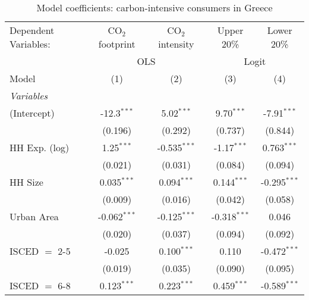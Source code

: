 
\begin{table}[htbp!]
   \centering
   \small
   \begin{adjustbox}{width = 1\textwidth, max height = 0.95\textheight, center}
      \begin{threeparttable}[b]
         \caption{\label{tab:Logit_1_GRC} Model coefficients: carbon-intensive consumers in Greece}
         \begin{tabular}{lcccc}
            \tabularnewline \midrule \midrule
            Dependent Variables: & CO$_{2}$ footprint & CO$_{2}$ intensity & Upper 20\%     & Lower 20\%\\   
             & \multicolumn{2}{c}{OLS} & \multicolumn{2}{c}{Logit} \\ 
            Model                & (1)                & (2)                & (3)            & (4)\\  
            \midrule
            \emph{Variables}\\
            (Intercept)          & -12.3$^{***}$      & 5.02$^{***}$       & 9.70$^{***}$   & -7.91$^{***}$\\   
                                 & (0.196)            & (0.292)            & (0.737)        & (0.844)\\   
            HH Exp. (log)        & 1.25$^{***}$       & -0.535$^{***}$     & -1.17$^{***}$  & 0.763$^{***}$\\   
                                 & (0.021)            & (0.031)            & (0.084)        & (0.094)\\   
            HH Size              & 0.035$^{***}$      & 0.094$^{***}$      & 0.144$^{***}$  & -0.295$^{***}$\\   
                                 & (0.009)            & (0.016)            & (0.042)        & (0.058)\\   
            Urban Area           & -0.062$^{***}$     & -0.125$^{***}$     & -0.318$^{***}$ & 0.046\\   
                                 & (0.020)            & (0.037)            & (0.094)        & (0.092)\\   
            ISCED $=$ 2-5        & -0.025             & 0.100$^{***}$      & 0.110          & -0.472$^{***}$\\   
                                 & (0.019)            & (0.035)            & (0.090)        & (0.095)\\   
            ISCED $=$ 6-8        & 0.123$^{***}$      & 0.223$^{***}$      & 0.459$^{***}$  & -0.589$^{***}$\\   

\end{tabular}
\end{threeparttable}
\end{adjustbox}
\end{table}
